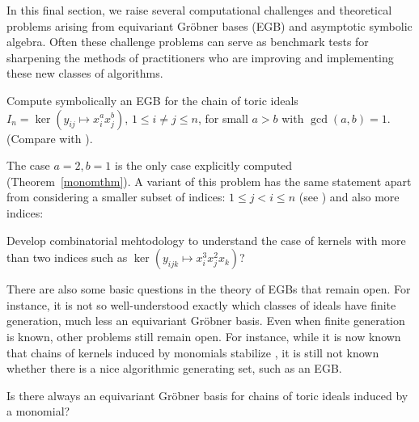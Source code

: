 
In this final section, we raise several computational challenges and theoretical problems arising from equivariant Gr\"obner bases (EGB) and asymptotic symbolic algebra.  Often these challenge problems can serve as benchmark tests for sharpening the methods of practitioners who are improving and implementing these new classes of algorithms.

\begin{problem}
Compute symbolically an EGB for the chain of toric ideals $I_n = \ker(y_{ij} \mapsto x_i^a x_j^b)$, $1 \leq i \neq j \leq n$, for small $a>b$ with $\gcd(a,b)=1$. (Compare with \cite{Hillar13, hillar2016corrigendum, KKL:equivariant-markov, draisma2013noetherianity, Krone:egb-toric}).
\end{problem}

The case $a=2,b=1$ is the only case explicitly computed (Theorem~\ref{monomthm}). A variant of this problem has the same statement apart from considering a smaller subset of indices: $1 \leq j < i \leq n$ (see \cite[Remark 6.3]{draisma2013noetherianity}) and also more indices:

\begin{problem}
Develop combinatorial mehtodology to understand the case of kernels with more than two indices such as $\ker(y_{ijk} \mapsto x_i^3 x_j^2 x_k)$?  
\end{problem}

There are also some basic questions in the theory of EGBs that remain open.  For instance, it is not so well-understood exactly which classes of ideals have finite generation, much less an equivariant Gr\"obner basis.  Even when finite generation is known, other problems still remain open.  For instance, while it is now known that chains of kernels induced by monomials stabilize \cite{aschenbrenner2007finite, KKL:equivariant-markov, draisma2013noetherianity}, it is still not known whether there is a nice algorithmic generating set, such as an EGB.

\begin{question}
Is there always an equivariant Gr\"obner basis for chains of toric ideals induced by a monomial?
\end{question}


